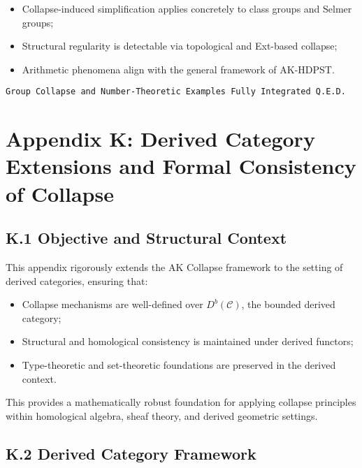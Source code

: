 \documentclass[11pt]{article}
\begin{document}
\begin{itemize}
    \item Collapse-induced simplification applies concretely to class groups and Selmer groups;
    \item Structural regularity is detectable via topological and Ext-based collapse;
    \item Arithmetic phenomena align with the general framework of AK-HDPST.
\end{itemize}

\begin{flushright}
\texttt{Group Collapse and Number-Theoretic Examples \quad Fully Integrated \quad Q.E.D.}
\end{flushright}



\section*{Appendix K: Derived Category Extensions and Formal Consistency of Collapse}

\subsection*{K.1 Objective and Structural Context}

This appendix rigorously extends the AK Collapse framework to the setting of derived categories, ensuring that:

\begin{itemize}
    \item Collapse mechanisms are well-defined over \( D^b(\mathcal{C}) \), the bounded derived category;
    \item Structural and homological consistency is maintained under derived functors;
    \item Type-theoretic and set-theoretic foundations are preserved in the derived context.
\end{itemize}

This provides a mathematically robust foundation for applying collapse principles within homological algebra, sheaf theory, and derived geometric settings.

\subsection*{K.2 Derived Category Framework}
\end{document}
